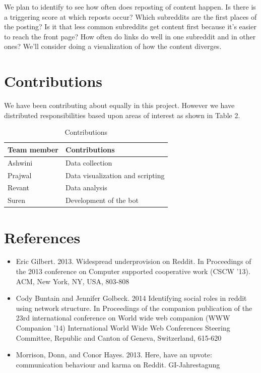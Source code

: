 \documentclass{article} %
\begin{document}
We plan to identify to see how often does reposting of content happen. Is there is a triggering score at which reposts occur? Which subreddits are the first places of the posting? Is it that less common subreddits get content first because it's easier to reach the front page? How often do links do well in one subreddit and in other ones? We'll consider doing a visualization of how the content diverges.


\section{Contributions}
We have been contributing about equally in this project. However we have distributed responsibilities based upon areas of interest as shown in Table 2.


\begin{table}
\begin{center}
    \begin{tabular}{ | l | l | }
    \hline
    Team member & Contributions \\ \hline
    Ashwini & Data collection \\ \hline
    Prajwal & Data visualization and scripting \\ \hline
    Revant & Data analysis \\ \hline
    Suren & Development of the bot \\ 
    \hline
    \end{tabular}
    \caption{Contributions}
    \end{center}
    \end{table}



\section{References}
\begin{itemize}
\item Eric Gilbert. 2013. Widespread underprovision on Reddit. In Proceedings of the 2013 conference on Computer supported cooperative work (CSCW '13). ACM, New York, NY, USA, 803-808
\item Cody Buntain and Jennifer Golbeck. 2014 Identifying social roles in reddit using network structure. In Proceedings of the companion publication of the 23rd international conference on World wide web companion (WWW Companion '14) International World Wide Web Conferences Steering Committee, Republic and Canton of Geneva, Switzerland, 615-620
\item Morrison, Donn, and Conor Hayes. 2013. Here, have an upvote: communication behaviour and karma on Reddit. GI-Jahrestagung
\end{itemize}
\end{document}
